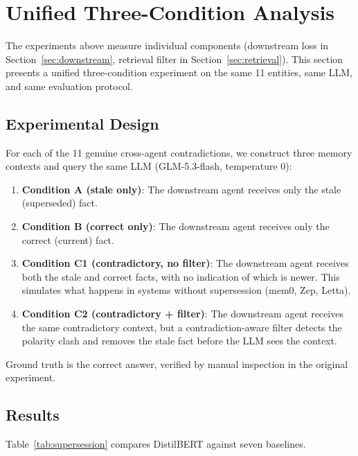 \documentclass{article}
\begin{document}
\section{Unified Three-Condition Analysis}
\label{sec:unified}

The experiments above measure individual components (downstream loss in Section~\ref{sec:downstream}, retrieval filter in Section~\ref{sec:retrieval}). This section presents a unified three-condition experiment on the same 11 entities, same LLM, and same evaluation protocol.

\subsection{Experimental Design}

For each of the 11 genuine cross-agent contradictions, we construct three memory contexts and query the same LLM (GLM-5.3-flash, temperature 0):

\begin{enumerate}
\item \textbf{Condition A (stale only)}: The downstream agent receives only the stale (superseded) fact.
\item \textbf{Condition B (correct only)}: The downstream agent receives only the correct (current) fact.
\item \textbf{Condition C1 (contradictory, no filter)}: The downstream agent receives both the stale and correct facts, with no indication of which is newer. This simulates what happens in systems without supersession (mem0, Zep, Letta).
\item \textbf{Condition C2 (contradictory + filter)}: The downstream agent receives the same contradictory context, but a contradiction-aware filter detects the polarity clash and removes the stale fact before the LLM sees the context.
\end{enumerate}

Ground truth is the correct answer, verified by manual inspection in the original experiment.

\subsection{Results}

Table~\ref{tab:supersession} compares DistilBERT against seven baselines.
\end{document}
